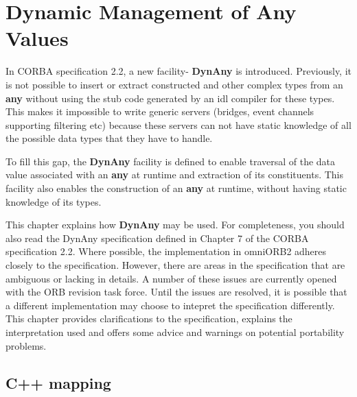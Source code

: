 \documentclass[11pt,twoside,onecolumn]{book}
\begin{document}
\chapter{Dynamic Management of Any Values}

In CORBA specification 2.2, a new facility- {\bf DynAny} is
introduced. Previously, it is not possible to insert or extract constructed
and other complex types from an {\bf any} without using the stub code
generated by an idl compiler for these types. This makes it impossible to
write generic servers (bridges, event channels supporting filtering etc)
because these servers can not have static knowledge of all the possible data
types that they have to handle. 

To fill this gap, the {\bf DynAny} facility is defined to enable traversal
of the data value associated with an {\bf any} at runtime and extraction of
its constituents. This facility also enables the construction of an {\bf
any} at runtime, without having static knowledge of its types.

This chapter explains how {\bf DynAny} may be used. For completeness, you
should also read the DynAny specification defined in Chapter 7 of the CORBA
specification 2.2. Where possible, the implementation in omniORB2 adheres
closely to the specification. However, there are areas in the specification
that are ambiguous or lacking in details. A number of these issues are
currently opened with the ORB revision task force. Until the issues are
resolved, it is possible that a different implementation may choose to
intepret the specification differently. This chapter provides
clarifications to the specification, explains the interpretation used and
offers some advice and warnings on potential portability problems.

\section{C++ mapping}
\end{document}
